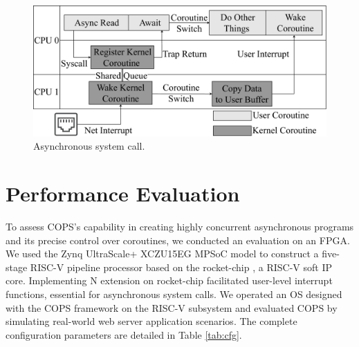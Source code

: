 \documentclass[conference]{IEEEtran}
\begin{document}
\begin{figure}[htbp]
  \centering
  \includegraphics[width=\linewidth]{assets/async_syscall.pdf}
  \caption{Asynchronous system call.}
  \label{fig:async_syscall}
  \vspace{-1em}
\end{figure}

\section{Performance Evaluation}
\label{section: Performance Evaluation}

To assess COPS's capability in creating highly concurrent asynchronous programs and its precise control over coroutines, we conducted an evaluation on an FPGA. We used the Zynq UltraScale+ XCZU15EG MPSoC model \cite{zynq} to construct a five-stage RISC-V pipeline processor based on the rocket-chip \cite{rocket-chip}, a RISC-V soft IP core. Implementing N extension \cite{waterman_volume_nodate} on rocket-chip facilitated user-level interrupt functions, essential for asynchronous system calls. We operated an OS designed with the COPS framework on the RISC-V subsystem and evaluated COPS by simulating real-world web server application scenarios. The complete configuration parameters are detailed in Table \ref{tab:cfg}.
\end{document}
